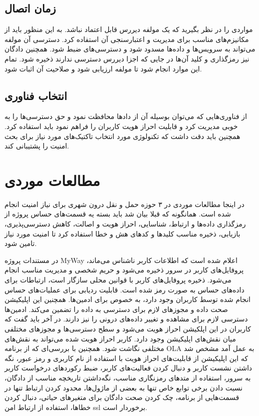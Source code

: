 \subsection{زمان اتصال}
مواردی را در نظر بگیرید که یک مولفه دیررس قابل اعتماد نباشد. 
به این منظور باید از مکانیزم‌های مناسب برای مدیریت و اعتبارسنجی آن‌ استفاده کرد. دسترسی آن مولفه می‌تواند به سرویس‌ها و داده‌ها مسدود شود و دسترسی‌های ضبط شود. همچنین دادگان نیز رمزگذاری و کلید آن‌ها در جایی که اجزا دیررس دسترسی ندارند ذخیره شود. تمام این موارد انجام شود تا مولفه ارزیابی شود و صلاحیت آن اثبات شود.

\subsection{انتخاب فناوری}
از فناوری‌هایی که می‌توان بوسیله آن از داد‌ها محافظت نمود و حق دسترسی‌ها را به خوبی مدیریت کرد و قابلیت احراز هویت کاربران را فراهم نمود باید استفاده کرد.
همچنین باید دقت داشت که تکنولوژی مورد انتخاب تاکتیک‌های مورد نیاز برای بحث امنیت را پشتیبانی کند.


\section{مطالعات موردی}
در اینجا مطالعات موردی در ۳ حوزه حمل و نقل درون شهری برای نیاز امنیت انجام شده است.
همانگونه که قبلا بیان شد باید بسته یه قسمت‌های حساس پروژه از رمزگذاری داد‌ه‌ها و ارتباط، شناسایی، احراز هویت و اصالت، کاهش دسترسی‌پذیری، بازیابی، ذخیره مناسب کلید‌ها و کدهای هش و خطا استفاده کرد تا امنیت مورد نیاز تامین شود.
 
در مستندات پروژه MyWay اعلام شده است که اطلاعات کاربر ناشناس می‌ماند، پروفایل‌های کاربر در سرور ذخیره می‌شود و حریم شخصی و مدیریت مناسب انجام می‌شود. ذخیره پروفایل‌های کاربر با قوانین محلی سازگار است، ارتباطات برای داده‌های حساس به صورت رمز شده است.  قابلیت ردیابی برای عملیات‌های حساس انجام شده توسط کاربران وجود دارد، به خصوص برای ادمین‌ها. همچنین این اپلیکیشن صحت داده و مجوز‌های لازم برای دسترسی به داده را تضمین می‌کند. ادمین‌ها دسترسی لازم برای مشاهده و تغییر داده‌های درونی را نیز دارند.
در آخر باید گفت که کاربران در این اپلکیشن احراز هویت می‌شود و سطح دسترسی‌ها و مجوزهای مختلفی میان نقش‌های اپلیکیشن وجود دارد. کاربر احراز هویت شده می‌تواند به نقش‌های مختلفی نگاشت شود.
همچنین با بررسی‌ای که از برنامه OLA به عمل آمد مشخص شد که این اپلیکیشن از قابلیت‌های احراز هویت با استفاده از نام کاربری و رمز عبور، نگه داشتن نشست کاربر و دنبال کردن فعالیت‌های کاربر، ضبط رکوردهای درخواست کاربر به سرور، استفاده از متد‌های رمزنگاری مناسب، نگه‌داشتن تاریخچه مناسب از دادگان، نسبت دادن برخی توابع خاص تنها به بعضی از ماژول‌ها، محدود کردن ارتباط تنها در قسمت‌هایی از برنامه،‌ چک کردن صحت دادگان برای متغیرهای حیاتی، دنبال کردن خطاها، استفاده از ارتباط امن ssl  برخوردار است.

